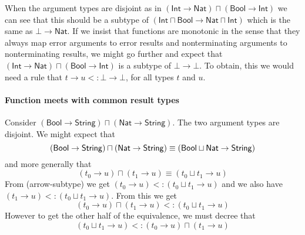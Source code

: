 \documentclass[12pt]{article}
\begin{document}
When the argument types are disjoint as in $\left( \mathsf{Int}\rightarrow 
\mathsf{Nat}\right) \sqcap \left( \mathsf{Bool}\rightarrow \mathsf{Int}%
\right) $ we can see that this should be a subtype of $\left( \mathsf{Int}%
\sqcap \mathsf{Bool}\rightarrow \mathsf{Nat}\sqcap \mathsf{Int}\right) $
which is the same as $\mathsf{\bot }\rightarrow \mathsf{Nat}$. If we insist
that functions are monotonic in the sense that they always map error
arguments to error results and nonterminating arguments to nonterminating
results, we might go further and expect that $\left( \mathsf{Int}\rightarrow 
\mathsf{Nat}\right) \sqcap \left( \mathsf{Bool}\rightarrow \mathsf{Int}%
\right) $ is a subtype of $\mathsf{\bot }\rightarrow \mathsf{\bot }$. To
obtain, this we would need a rule that $t\rightarrow u<:\mathsf{\bot }%
\rightarrow \mathsf{\bot }$, for all types $t$ and $u$.

\paragraph{Function meets with common result types}

Consider $\left( \mathsf{Bool}\rightarrow \mathsf{String}\right) \sqcap
\left( \mathsf{Nat}\rightarrow \mathsf{String}\right) $. The two argument
types are disjoint. We might expect that 
\begin{equation*}
\left( \mathsf{Bool}\rightarrow \mathsf{String}\right) \sqcap \left( \mathsf{%
Nat}\rightarrow \mathsf{String}\right) \equiv \left( \mathsf{Bool}\sqcup 
\mathsf{Nat}\rightarrow \mathsf{String}\right) 
\end{equation*}%
and more generally that 
\begin{equation*}
\left( t_{0}\rightarrow u\right) \sqcap \left( t_{1}\rightarrow u\right)
\equiv \left( t_{0}\sqcup t_{1}\rightarrow u\right) 
\end{equation*}%
From (arrow-subtype) we get $\left( t_{0}\rightarrow u\right) <:\left(
t_{0}\sqcup t_{1}\rightarrow u\right) $ and we also have $\left(
t_{1}\rightarrow u\right) <:\left( t_{0}\sqcup t_{1}\rightarrow u\right) $.
From this we get 
\begin{equation*}
\left( t_{0}\rightarrow u\right) \sqcap \left( t_{1}\rightarrow u\right)
<:\left( t_{0}\sqcup t_{1}\rightarrow u\right) 
\end{equation*}%
However to get the other half of the equivalence, we must decree that%
\begin{equation*}
\left( t_{0}\sqcup t_{1}\rightarrow u\right) <:\left( t_{0}\rightarrow
u\right) \sqcap \left( t_{1}\rightarrow u\right) 
\end{equation*}
\end{document}
